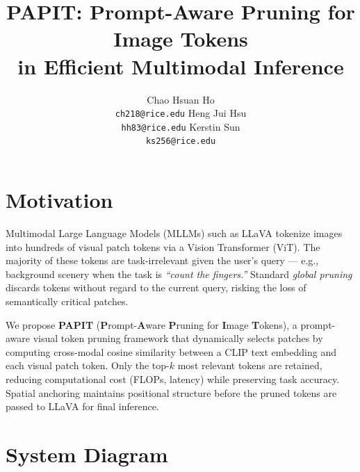 \documentclass{article}
\title{PAPIT: Prompt-Aware Pruning for Image Tokens \\
       in Efficient Multimodal Inference}
\author{%
  Chao Hsuan Ho \\
  \small\texttt{ch218@rice.edu}
  \And
  Heng Jui Hsu \\
  \small\texttt{hh83@rice.edu}
  \And
  Kerstin Sun \\
  \small\texttt{ks256@rice.edu}
}
\begin{document}
\maketitle
\vspace{-3.0em}

\section*{Motivation}
\vspace{-0.1em}
Multimodal Large Language Models (MLLMs) such as LLaVA tokenize images
into hundreds of visual patch tokens via a Vision Transformer (ViT).
The majority of these tokens are task-irrelevant given the user's
query — e.g., background scenery when the task is \emph{``count the fingers.''}
Standard \emph{global pruning} discards tokens without regard to the
current query, risking the loss of semantically critical patches.

We propose \textbf{PAPIT} (\textbf{P}rompt-\textbf{A}ware \textbf{P}runing for \textbf{I}mage \textbf{T}okens), a prompt-aware visual token pruning
framework that dynamically selects patches by computing cross-modal
cosine similarity between a CLIP text embedding and each visual patch
token. Only the top-$k$ most relevant tokens are retained, reducing
computational cost (FLOPs, latency) while preserving task accuracy.
Spatial anchoring maintains positional structure before the
pruned tokens are passed to LLaVA for final inference.

\section*{System Diagram}
\end{document}
